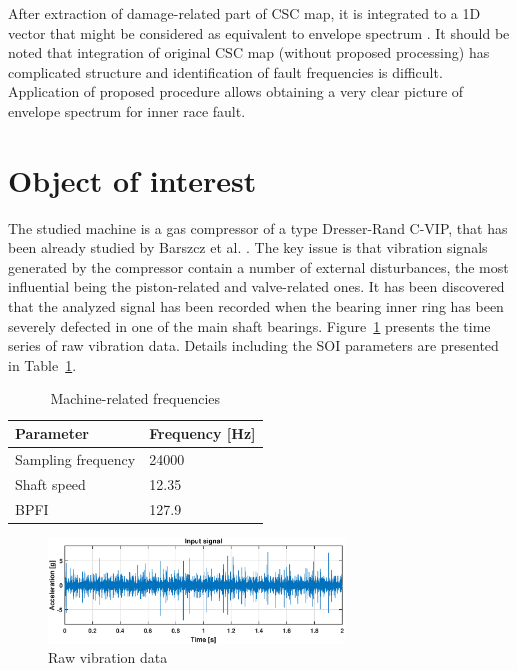 \documentclass[3p, 12pt]{elsarticle} %
\begin{document}
After extraction of damage-related part of CSC map, it is integrated to a 1D vector that might be considered as equivalent to envelope spectrum \cite{randall2011rolling}.
It should be noted that integration of original CSC map (without proposed processing) has complicated structure and identification of fault frequencies is difficult. Application of proposed procedure allows obtaining a very clear picture of envelope spectrum for inner race fault.

\section{Object of interest}

The studied machine is a gas compressor of a type Dresser-Rand C-VIP, that has been already studied by Barszcz et al. \cite{barszcz2013bearings}. The key issue is that vibration signals generated by the compressor contain a number of external disturbances, the most influential being the piston-related and valve-related ones. It has been discovered that the analyzed signal has been recorded when the bearing inner ring has been severely defected in one of the main shaft bearings. Figure~\ref{fig:raw} presents the time series of raw vibration data. Details including the SOI parameters are presented in Table~\ref{tab:tab1}. 

\begin{table}[ht!]
    \centering
    \caption{Machine-related frequencies}
    \begin{tabular}{|l|l|}
    \hline
         \textbf{Parameter} & \textbf{Frequency [Hz]} \\ \hline
         Sampling frequency & 24000 \\ \hline
         Shaft speed & 12.35 \\ \hline
         BPFI & 127.9 \\ 
    \hline
    \end{tabular}
    \label{tab:tab1}
\end{table}

\begin{figure}[ht!]
\centering
\includegraphics[width=0.7\textwidth]{wykresy/raw}
\caption{Raw vibration data}
\label{fig:raw}
\end{figure}
\end{document}
